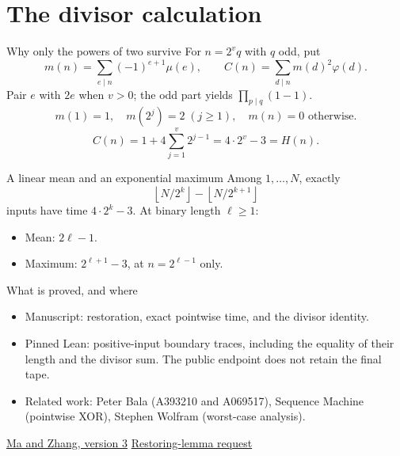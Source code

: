 \documentclass{beamer}
\begin{document}
\section{The divisor calculation}
\begin{frame}{Why only the powers of two survive}
  For $n=2^v q$ with $q$ odd, put
  \[
  m(n)=\sum_{e\mid n}(-1)^{e+1}\mu(e),\qquad
  C(n)=\sum_{d\mid n}m(d)^2\varphi(d).
  \]
  Pair $e$ with $2e$ when $v>0$; the odd part yields $\prod_{p\mid q}(1-1)$.
  \[
    m(1)=1,\quad m(2^j)=2\;(j\ge1),\quad m(n)=0\text{ otherwise}.
  \]
  \[C(n)=1+4\sum_{j=1}^{v}2^{j-1}=4\cdot2^v-3=H(n).\]
\end{frame}
\begin{frame}{A linear mean and an exponential maximum}
  Among $1,\ldots,N$, exactly
  \[\left\lfloor N/2^k\right\rfloor-\left\lfloor N/2^{k+1}\right\rfloor\]
  inputs have time $4\cdot2^k-3$. At binary length $\ell\ge1$:
  \begin{itemize}
     \item Mean: $2\ell-1$.
     \item Maximum: $2^{\ell+1}-3$, at $n=2^{\ell-1}$ only.
  \end{itemize}
\end{frame}
\begin{frame}{What is proved, and where}
  \begin{itemize}
  \item Manuscript: restoration, exact pointwise time, and the divisor identity.
  \item Pinned Lean: positive-input boundary traces, including the equality of their length and the divisor sum. The public endpoint does not retain the final tape.
  \item Related work: Peter Bala (A393210 and A069517), Sequence Machine (pointwise XOR), Stephen Wolfram (worst-case analysis).
  \end{itemize}
  \href{https://doi.org/10.5281/zenodo.24405774}{Ma and Zhang, version 3} \qquad
  \href{https://github.com/the-omega-institute/trureturing-requests/issues/530}{Restoring-lemma request}
\end{frame}
\appendix
\FormalVerification
\end{document}

